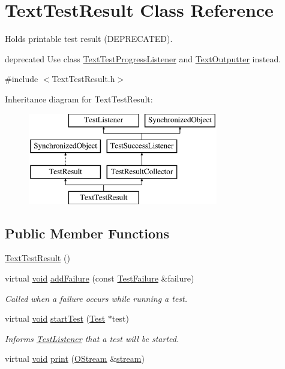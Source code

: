 \hypertarget{class_text_test_result}{\section{Text\-Test\-Result Class Reference}
\label{class_text_test_result}
}


Holds printable test result (D\-E\-P\-R\-E\-C\-A\-T\-E\-D).

deprecated Use class \hyperlink{class_text_test_progress_listener}{Text\-Test\-Progress\-Listener} and \hyperlink{class_text_outputter}{Text\-Outputter} instead.  




{\ttfamily \#include $<$Text\-Test\-Result.\-h$>$}

Inheritance diagram for Text\-Test\-Result\-:\begin{figure}[H]
\begin{center}
\leavevmode
\includegraphics[height=4.000000cm]{class_text_test_result}
\end{center}
\end{figure}
\subsection*{Public Member Functions}
\begin{DoxyCompactItemize}
\item 
\hyperlink{class_text_test_result_a7496d86526a7d21286aeecdcf6cf2458}{Text\-Test\-Result} ()
\item 
virtual \hyperlink{wglew_8h_aeea6e3dfae3acf232096f57d2d57f084}{void} \hyperlink{class_text_test_result_a05d3b0e8e51b3430092166bbc3d17708}{add\-Failure} (const \hyperlink{class_test_failure}{Test\-Failure} \&failure)
\begin{DoxyCompactList}\small\item\em Called when a failure occurs while running a test. \end{DoxyCompactList}\item 
virtual \hyperlink{wglew_8h_aeea6e3dfae3acf232096f57d2d57f084}{void} \hyperlink{class_text_test_result_a2191f5e916fca83151fb657b31dcd30d}{start\-Test} (\hyperlink{class_test}{Test} $\ast$test)
\begin{DoxyCompactList}\small\item\em Informs \hyperlink{class_test_listener}{Test\-Listener} that a test will be started. \end{DoxyCompactList}\item 
virtual \hyperlink{wglew_8h_aeea6e3dfae3acf232096f57d2d57f084}{void} \hyperlink{class_text_test_result_a35fdfec0767de9f4c4fa0e319dfedb3b}{print} (\hyperlink{_stream_8h_a80291a4e32881b445c8d4f839a9dd979}{O\-Stream} \&\hyperlink{glew_8h_a10d3bc96cdfc1d478f52c13d5ffd9316}{stream})
\end{DoxyCompactItemize}
